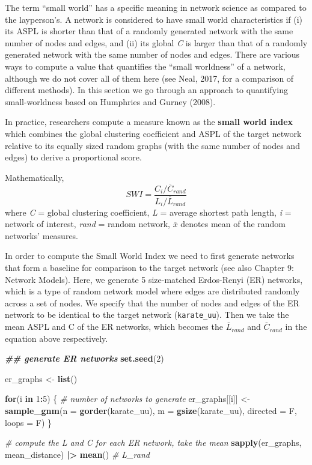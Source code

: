 \documentclass[
]{book}
\newenvironment{Shaded}{\begin{snugshade}}{\end{snugshade}}
\newcommand{\AttributeTok}[1]{\textcolor[rgb]{0.13,0.29,0.53}{#1}}
\newcommand{\CommentTok}[1]{\textcolor[rgb]{0.56,0.35,0.01}{\textit{#1}}}
\newcommand{\ControlFlowTok}[1]{\textcolor[rgb]{0.13,0.29,0.53}{\textbf{#1}}}
\newcommand{\DecValTok}[1]{\textcolor[rgb]{0.00,0.00,0.81}{#1}}
\newcommand{\DocumentationTok}[1]{\textcolor[rgb]{0.56,0.35,0.01}{\textbf{\textit{#1}}}}
\newcommand{\FunctionTok}[1]{\textcolor[rgb]{0.13,0.29,0.53}{\textbf{#1}}}
\newcommand{\NormalTok}[1]{#1}
\newcommand{\OtherTok}[1]{\textcolor[rgb]{0.56,0.35,0.01}{#1}}
\newcommand{\SpecialCharTok}[1]{\textcolor[rgb]{0.81,0.36,0.00}{\textbf{#1}}}
\begin{document}
The term ``small world'' has a specific meaning in network science as compared to the layperson's. A network is considered to have small world characteristics if (i) its ASPL is shorter than that of a randomly generated network with the same number of nodes and edges, and (ii) its global \emph{C} is larger than that of a randomly generated network with the same number of nodes and edges. There are various ways to compute a value that quantifies the ``small worldness'' of a network, although we do not cover all of them here (see Neal, 2017, for a comparison of different methods). In this section we go through an approach to quantifying small-worldness based on Humphries and Gurney (2008).

In practice, researchers compute a measure known as the \textbf{small world index} which combines the global clustering coefficient and ASPL of the target network relative to its equally sized random graphs (with the same number of nodes and edges) to derive a proportional score.

Mathematically,
\[SWI = \frac{C_i / \overline C_{rand}}{L_i / \overline L_{rand}}\]
where \emph{C} = global clustering coefficient, \emph{L} = average shortest path length, \emph{i} = network of interest, \emph{rand} = random network, \(\overline x\) denotes mean of the random networks' measures.

In order to compute the Small World Index we need to first generate networks that form a baseline for comparison to the target network (see also Chapter 9: Network Models). Here, we generate 5 size-matched Erdos-Renyi (ER) networks, which is a type of random network model where edges are distributed randomly across a set of nodes. We specify that the number of nodes and edges of the ER network to be identical to the target network (\texttt{karate\_uu}). Then we take the mean ASPL and C of the ER networks, which becomes the \(\overline L_{rand}\) and \(\overline C_{rand}\) in the equation above respectively.

\begin{Shaded}
\begin{Highlighting}[]
\DocumentationTok{\#\# generate ER networks }
\FunctionTok{set.seed}\NormalTok{(}\DecValTok{2}\NormalTok{)}

\NormalTok{er\_graphs }\OtherTok{\textless{}{-}} \FunctionTok{list}\NormalTok{()}

\ControlFlowTok{for}\NormalTok{(i }\ControlFlowTok{in} \DecValTok{1}\SpecialCharTok{:}\DecValTok{5}\NormalTok{) \{ }\CommentTok{\# number of networks to generate}
\NormalTok{  er\_graphs[[i]] }\OtherTok{\textless{}{-}} \FunctionTok{sample\_gnm}\NormalTok{(}\AttributeTok{n =} \FunctionTok{gorder}\NormalTok{(karate\_uu), }\AttributeTok{m =} \FunctionTok{gsize}\NormalTok{(karate\_uu), }\AttributeTok{directed =}\NormalTok{ F, }\AttributeTok{loops =}\NormalTok{ F)}
\NormalTok{\}}

\CommentTok{\# compute the L and C for each ER network, take the mean }
\FunctionTok{sapply}\NormalTok{(er\_graphs, mean\_distance) }\SpecialCharTok{|\textgreater{}} \FunctionTok{mean}\NormalTok{() }\CommentTok{\# L\_rand}
\end{Highlighting}
\end{Shaded}
\end{document}
